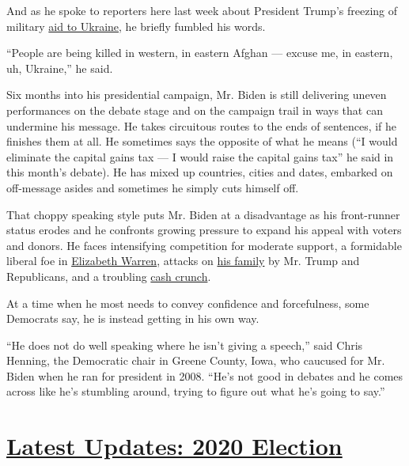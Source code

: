 And as he spoke to reporters here last week about President Trump's
freezing of military
\href{https://www.nytimes.com/2019/10/23/us/politics/ukraine-aid-freeze-impeachment.html}{aid
to Ukraine}, he briefly fumbled his words.

``People are being killed in western, in eastern Afghan --- excuse me,
in eastern, uh, Ukraine,'' he said.

Six months into his presidential campaign, Mr. Biden is still delivering
uneven performances on the debate stage and on the campaign trail in
ways that can undermine his message. He takes circuitous routes to the
ends of sentences, if he finishes them at all. He sometimes says the
opposite of what he means (``I would eliminate the capital gains tax ---
I would raise the capital gains tax'' he said in this month's debate).
He has mixed up countries, cities and dates, embarked on off-message
asides and sometimes he simply cuts himself off.

That choppy speaking style puts Mr. Biden at a disadvantage as his
front-runner status erodes and he confronts growing pressure to expand
his appeal with voters and donors. He faces intensifying competition for
moderate support, a formidable liberal foe in
\href{https://www.nytimes.com/interactive/2020/us/elections/elizabeth-warren.html}{Elizabeth
Warren}, attacks on
\href{https://www.nytimes.com/2019/10/15/us/politics/hunter-biden-interview.html}{his
family} by Mr. Trump and Republicans, and a troubling
\href{https://www.nytimes.com/2019/10/16/us/politics/democratic-fundraising-joe-biden.html}{cash
crunch}.

At a time when he most needs to convey confidence and forcefulness, some
Democrats say, he is instead getting in his own way.

``He does not do well speaking where he isn't giving a speech,'' said
Chris Henning, the Democratic chair in Greene County, Iowa, who caucused
for Mr. Biden when he ran for president in 2008. ``He's not good in
debates and he comes across like he's stumbling around, trying to figure
out what he's going to say.''

\hypertarget{latest-updates-2020-election}{%
\section{\texorpdfstring{\href{https://www.nytimes.com/2020/07/31/us/elections/biden-vs-trump.html?action=click\&pgtype=Article\&state=default\&region=MAIN_CONTENT_1\&context=storylines_live_updates}{Latest
Updates: 2020
Election}}{Latest Updates: 2020 Election}}\label{latest-updates-2020-election}}

